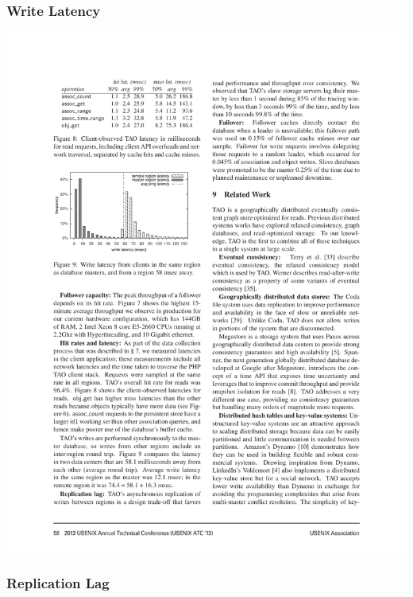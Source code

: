 \begin{frame}[c]\frametitle{Write Latency}
   	\includegraphics[width=\textwidth]{figs/writes.pdf}
\end{frame}

\begin{frame}[c]\frametitle{Replication Lag}
    


\end{frame}

